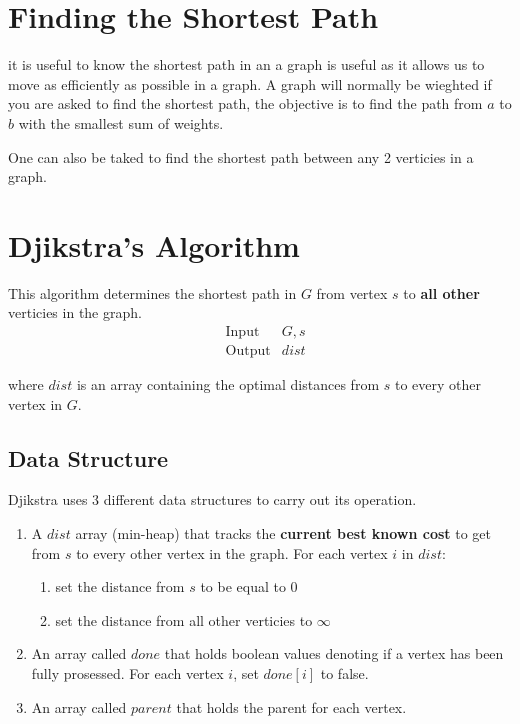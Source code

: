 \documentclass[12pt]{book}
\title{\coursetitle\linebreak\lecturename}
\author{\\Cain Susko\\ 
           \\ \\ \\
      Queen's University 
    \\School of Computing\\}
\begin{document}
\begin{titlepage}
        \maketitle
\end{titlepage}


\section*{Finding the Shortest Path}
it is useful to know the shortest path in an a graph is
useful as it allows us to move as efficiently as possible
in a graph. A graph will normally be wieghted if you
are asked to find the shortest path, the objective is to 
find the path from $a$ to $b$ with the smallest sum of weights.

One can also be taked to find the shortest path between any 2 verticies
in a graph.

\section*{Djikstra's Algorithm}
This algorithm determines the shortest path in $G$ from vertex $s$ to
\textbf{all other} verticies in the graph.
\begin{align*}
        &\text{Input} &G, s\\
        &\text{Output} &dist
\end{align*}

where $dist$ is an array containing the optimal distances from $s$
to every other vertex in $G$.

\subsection*{Data Structure}
Djikstra uses 3 different data structures to carry out its operation.
\begin{enumerate}
        \item A $dist$ array (min-heap) that tracks the \textbf{current
                best known cost} to get from $s$ to every other vertex in
                the graph. For each vertex $i$ in $dist$:
        \begin{enumerate}
                \item set the distance from $s$ to be equal 
                        to 0
                \item set the distance from all other verticies to $\infty$
        \end{enumerate}
        \item An array called $done$ that holds boolean values denoting
                if a vertex has been fully prosessed. For each vertex $i$,
                set $done[i]$ to false.
        \item An array called $parent$ that holds the parent for each
                vertex.
\end{enumerate}
\pagebreak
\end{document}
